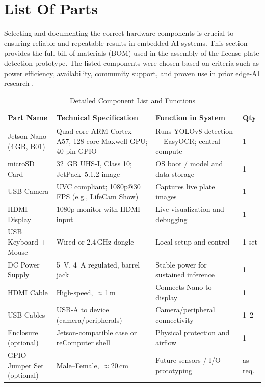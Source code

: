 %
%

\chapter{List Of Parts}

Selecting and documenting the correct hardware components is crucial to ensuring reliable and repeatable results in embedded AI systems.  
This section provides the full bill of materials (BOM) used in the assembly of the license plate detection prototype.  
The listed components were chosen based on criteria such as power efficiency, availability, community support, and proven use in prior edge-AI research \cite{nvidia-jetson, edge-ai-survey, embedded-vision, yolov8-performance}.

\begin{table}[H]
	\centering
	\caption{Detailed Component List and Functions}
	\begin{tabular}{|L{3.2cm}|L{6.4cm}|L{4.0cm}|L{1.2cm}|}
		\hline
		\textbf{Part Name} & \textbf{Technical Specification} & \textbf{Function in System} & \textbf{Qty} \\ \hline
		Jetson Nano (4\,GB, B01) & Quad-core ARM Cortex-A57, 128-core Maxwell GPU; 40-pin GPIO & Runs YOLOv8 detection + EasyOCR; central compute & 1 \\ \hline
		microSD Card & \SI{32}{GB} UHS-I, Class 10; JetPack~5.1.2 image & OS boot / model and data storage & 1 \\ \hline
		USB Camera & UVC compliant; 1080p@30\,FPS (e.g., LifeCam Show) & Captures live plate images & 1 \\ \hline
		HDMI Display & 1080p monitor with HDMI input & Live visualization and debugging & 1 \\ \hline
		USB Keyboard + Mouse & Wired or 2.4\,GHz dongle & Local setup and control & 1 set \\ \hline
		DC Power Supply & \SI{5}{V}, \SI{4}{A} regulated, barrel jack & Stable power for sustained inference & 1 \\ \hline
		HDMI Cable & High-speed, \(\approx\)1\,m & Connects Nano to display & 1 \\ \hline
		USB Cables & USB-A to device (camera/peripherals) & Camera/peripheral connectivity & 1--2 \\ \hline
		Enclosure (optional) & Jetson-compatible case or reComputer shell & Physical protection and airflow & 1 \\ \hline
		GPIO Jumper Set (optional) & Male--Female, \(\approx\)20\,cm & Future sensors / I/O prototyping & as req. \\ \hline
	\end{tabular}
\end{table}


